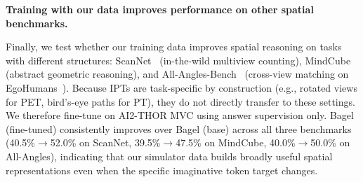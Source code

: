 

\begin{takeawayblock}
    \textbf{Training with our data improves performance on other spatial benchmarks.}
\end{takeawayblock}
Finally, we test whether our training data improves spatial reasoning on tasks with different structures: ScanNet~\cite{dai2017scannet} (in-the-wild multiview counting), MindCube~\cite{yin2025mindcube} (abstract geometric reasoning), and All-Angles-Bench~\cite{yeh2025seeing} (cross-view matching on EgoHumans~\cite{khirodkar2023egohumans}).
Because IPTs are task-specific by construction (e.g., rotated views for PET, bird's-eye paths for PT), they do not directly transfer to these settings. We therefore fine-tune on AI2-THOR MVC using answer supervision only.
Bagel (fine-tuned) consistently improves over Bagel (base) across all three benchmarks (40.5\%$\to$52.0\% on ScanNet, 39.5\%$\to$47.5\% on MindCube, 40.0\%$\to$50.0\% on All-Angles), indicating that our simulator data builds broadly useful spatial representations even when the specific imaginative token target changes.
